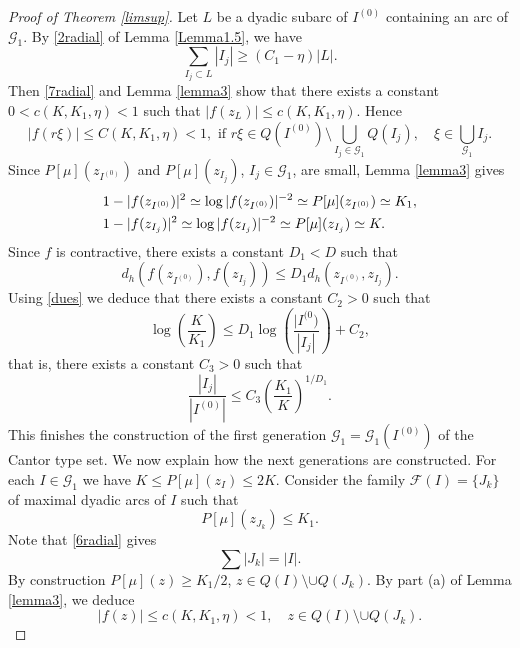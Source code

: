 \documentclass[a4paper,12pt]{article}
\theoremstyle{definition}
\numberwithin{equation}{section}
\begin{document}
\begin{proof}[Proof of Theorem \ref{limsup}]
Let $L$ be a dyadic subarc of $I^{(0)}$ containing an arc of $\mathcal{G}_1$. By \eqref{2radial} of Lemma \ref{Lemma1.5}, we have
$$
\sum_{I_j \subset L } |I_j| \geq (C_1 - \eta ) |L|.
$$
Then \eqref{7radial} and Lemma \ref{lemma3} show that there exists a constant $0< c(K , K_1 , \eta ) < 1$ such that $|f(z_L)| \leq c(K, K_1, \eta) $. Hence
\begin{equation}
    \label{9radial}
    |f(r \xi)| \leq C(K, K_1 , \eta) < 1, \text{ if } r\xi \in Q(I^{(0)}) \setminus \bigcup_{I_j \in \mathcal{G}_1} Q(I_j) ,  \quad  \xi \in \bigcup_{\mathcal{G}_1} I_j . 
\end{equation}
Since $P [\mu] (z_{I^{(0)}})$ and $P[\mu] (z_{I_j})$, $I_j \in \mathcal{G}_1$, are small, Lemma 
\ref{lemma3} gives 
\begin{align}
\label{dues}
 1 & - |f(z_{I^{(0)}})|^2 \simeq \log  |f(z_{I^{(0)}})|^{-2} \simeq P [\mu] (z_{I^{(0)}}) \simeq K_1 , \\ 
\notag  1 & - |f(z_{I_j})|^2 \simeq \log  |f(z_{I_j})|^{-2} \simeq P [\mu] (z_{I_j}) \simeq  K  . 
\end{align}
Since $f$ is contractive, there exists a constant $D_1 < D$ such that 
$$ d_h (f(z_{I^{(0)}}), f (z_{I_j})) \leq D_1 d_h (z_{I^{(0)}}, z_{I_j}) .
$$ 
Using \eqref{dues} we deduce that there exists a constant $C_2 >0$ such that  
$$
\log \left(\frac{K}{K_1} \right) \leq D_1 \log \left (\frac{|I^{(0})}{|I_j|} \right) + C_2 , 
$$
that is, there exists a constant $C_3  >0$ such that 
\begin{equation}
    \label{10radial}
    \frac{|I_j|}{|I^{(0)}|} \leq C_3 \left(\frac{K_1}{K} \right)^{1/D_1} . 
\end{equation}
This finishes the construction of the first generation $\mathcal{G}_{1} =\mathcal{G}_{1}\left(I^{(0)}\right)$ of the Cantor type set. We now explain how the next generations are constructed. For each $I \in \mathcal{G}_{1}$ we have $K \leq P[\mu]\left(z_{I}\right) \leq 2 K$. Consider the family $\mathcal{F}(I)= \{ J_{k} \}$ of maximal dyadic arcs of $I$ such that
$$
P [\mu] \left(z_{J_{k}}\right) \leqslant K_{1} . 
$$
Note that \eqref{6radial} gives
\begin{equation}
    \label{11radial}
    \sum\left|J_{k}\right|=|I| . 
\end{equation}
By construction $P [\mu] (z) \geqslant K_1 / 2$, $z \in Q(I) \setminus \cup Q\left(J_{k}\right)$. 
By part (a) of Lemma \ref{lemma3}, we deduce
\begin{equation}
    \label{12radial}
    |f(z)| \leq c(K, K_1 , \eta) < 1, \quad z \in Q(I) \setminus \cup Q\left(J_{k}\right). 

\end{equation}
\end{proof}
\end{document}
